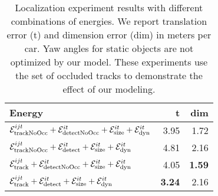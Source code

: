 

\begin{table}
  \begin{tabular}{lrr}
    \toprule
    Energy & t & dim \\
    \midrule
    $\mathcal{E}^{ijt}_{\text{trackNoOcc}} + \mathcal{E}^{it}_{\text{detectNoOcc}} +\mathcal{E}^{it}_{\text{size}}+\mathcal{E}^{it}_{\text{dyn}}$ 
    & 3.95  & 1.72\\        
    $\mathcal{E}^{ijt}_{\text{trackNoOcc}} + \mathcal{E}^{it}_{\text{detect}} +\mathcal{E}^{it}_{\text{size}}+\mathcal{E}^{it}_{\text{dyn}}$        
    & 4.81  & 2.16\\        
    $\mathcal{E}^{ijt}_{\text{track}} + \mathcal{E}^{it}_{\text{detectNoOcc}} +\mathcal{E}^{it}_{\text{size}}+\mathcal{E}^{it}_{\text{dyn}}$      
    & 4.05  & {\bf 1.59}\\        
    $\mathcal{E}^{ijt}_{\text{track}} + \mathcal{E}^{it}_{\text{detect}} +\mathcal{E}^{it}_{\text{size}}+\mathcal{E}^{it}_{\text{dyn}}$             
    & {\bf 3.24}  & 2.16\\
    \bottomrule
  \end{tabular}
  \caption{\small Localization experiment results with different combinations of energies. We report translation error (t) and dimension error (dim) in meters per car. Yaw angles for static objects are not optimized by our model. These experiments use the set of occluded tracks to demonstrate the effect of our modeling.}
  \label{tab:localizationExperiment}
\end{table}


